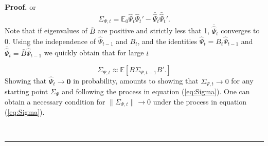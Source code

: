 \documentclass[thmsb,11pt]{article}
\newenvironment{proof}[1][Proof]{\noindent \textbf{#1.} }{\  \rule{0.5em}{0.5em}}
\begin{document}
\begin{appendix}
\begin{proof}
 	or
 	\begin{equation}
 	 \Sigma_{\Psi,t}=\mathbb{E}_{0}\hat{\Psi}_t\hat{\Psi}_t'- \bar{\hat{\Psi}}_t \bar{\hat{\Psi}}_t '.
 	\end{equation}
Note that  if eigenvalues of $\overline B$ are positive and strictly less that 1, $\bar{\hat{\Psi}}_t $ converges to 0.  Using the independence of $\hat{\Psi}_{t-1}$ and $B_t$, and the identities $\hat{\Psi}_t = B_t \hat{\Psi}_{t-1}$ and $\bar {\hat{\Psi}}_t = \bar B \bar \hat{\Psi}_{t-1}$ we quickly obtain that for large $t$
 	
	\begin{equation}
		\Sigma_{\Psi,t} \approx \mathbb{E}[B \Sigma_{\Psi,t-1} B'.] \label{eq:Sigma}
	\end{equation}  Showing that $\hat{\Psi}_t \rightarrow \bm 0$ in probability, amounts to showing that $\Sigma_{\Psi,t}\rightarrow 0$ for any starting point $\Sigma_{\Psi}$ and following the process in equation (\ref{eq:Sigma}).  One can obtain a necessary condition for $\|\Sigma_{\Psi,t}\|\rightarrow 0$ under the process in equation (\ref{eq:Sigma}).

\end{proof}
\end{appendix}
\end{document}
